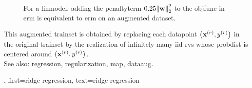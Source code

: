{{\begin{figure}[H]
\begin{center}
			\caption{For a \gls{linmodel}, adding the \gls{penaltyterm} $\regparam \normgeneric{\weights}{2}^2$ to 
				the \gls{objfunc} in \gls{erm} is equivalent to \gls{erm} on an augmented \gls{dataset}.  \label{fig_ridge_regression_dict} }
			\end{center}
		\end{figure} 
		This augmented \gls{trainset} is obtained by replacing each \gls{datapoint} 
		$\left( {\bf x}^{(r)},y^{(r)} \right)$ 
		in the original \gls{trainset} by the \gls{realization} of infinitely 
		many \gls{iid} \glspl{rv} whose \gls{probdist} is centered around 
		$\left( {\bf x}^{(r)},y^{(r)} \right)$.
	    		\\
		See also: \gls{regression}, \gls{regularization}, \gls{map}, \gls{dataaug}.},
	first={ridge regression},
	text={ridge regression}
}

